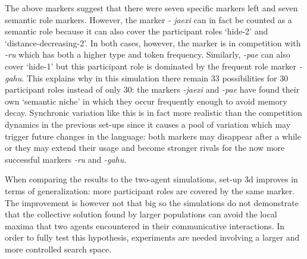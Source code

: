 The above markers suggest that there were seven specific markers left and seven semantic role markers. However, the marker {\em - jaexi} can in fact be counted as a semantic role because it can also cover the participant roles `hide-2' and `distance-decreasing-2'. In both cases, however, the marker is in competition with {\em -ru} which has both a higher type and token frequency. Similarly, {\em -pae} can also cover `hide-1' but this participant role is dominated by the frequent role marker {\em -gahu}. This explains why in this simulation there remain 33 possibilities for 30 participant roles instead of only 30: the markers {\em -jaexi} and {\em -pae} have found their own `semantic niche' in which they occur frequently enough to avoid memory decay. Synchronic variation like this is in fact more realistic than the competition dynamics in the previous set-ups since it causes a pool of variation which may trigger future changes in the language: both markers may disappear after a while or they may extend their usage and become stronger rivals for the now more successful markers {\em -ru} and {\em -gahu}.

When comparing the results to the two-agent simulations, set-up 3d improves in terms of generalization: more participant roles are covered by the same marker. The improvement is however not that big so the simulations do not demonstrate that the collective solution found by larger populations can avoid the local maxima that two agents encountered in their communicative interactions. In order to fully test this hypothesis, experiments are needed involving a larger and more controlled search space.


